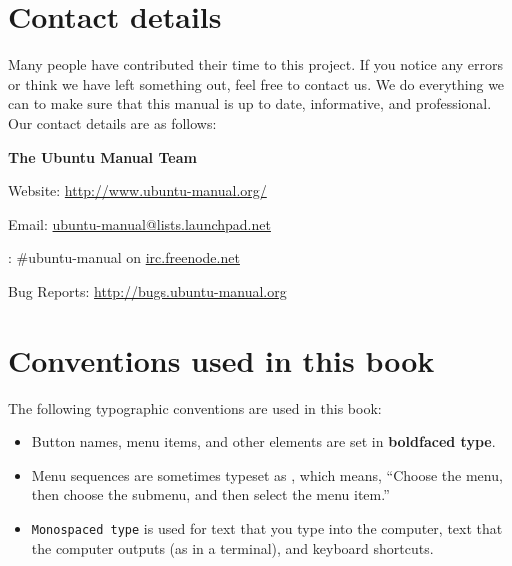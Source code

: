 \section{Contact details}

Many people have contributed their time to this project. If you notice any errors or think we have left something out, feel free to contact us. We do everything we can to make sure that this manual is up to date, informative, and professional. Our contact details are as follows:

\bigskip

\textbf{The Ubuntu Manual Team}

\smallskip
Website:
\url{http://www.ubuntu-manual.org/}

\smallskip
Email:
\url{ubuntu-manual@lists.launchpad.net}

\smallskip
{}: 
\#ubuntu-manual on \url{irc.freenode.net}

\smallskip
Bug Reports:
\url{http://bugs.ubuntu-manual.org}

\section{Conventions used in this book}

The following typographic conventions are used in this book:

\begin{itemize}

\item Button names, menu items, and other  elements are set in \textbf{boldfaced type}.

\item Menu sequences are sometimes typeset as , which means, ``Choose the  menu, then choose the  submenu, and then select the  menu item.''

\item \texttt{Monospaced type} is used for text that you type into the computer, text that the computer outputs (as in a terminal), and keyboard shortcuts.

\end{itemize}

